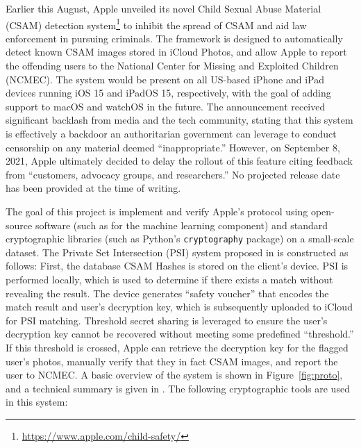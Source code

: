 
Earlier this August, Apple unveiled its novel Child Sexual Abuse Material (CSAM) detection system\footnote{\url{https://www.apple.com/child-safety/}} to inhibit the spread of CSAM and aid law enforcement in pursuing criminals. The framework is designed to automatically detect known CSAM images stored in iCloud Photos, and allow Apple to report the offending users to the National Center for Missing and Exploited Children (NCMEC). The system would be present on all US-based iPhone and iPad devices running iOS 15 and iPadOS 15, respectively, with the goal of adding support to macOS and watchOS in the future. The announcement received significant backlash from media and the tech community, stating that this system is effectively a backdoor an authoritarian government can leverage to conduct censorship on any material deemed ``inappropriate.'' However, on September 8, 2021, Apple ultimately decided to delay the rollout of this feature citing feedback from ``customers, advocacy groups, and researchers.'' No projected release date has been provided at the time of writing.

The goal of this project is implement and verify Apple's protocol using open-source software (such as \cite{athalyeNeuralHashCollider2021,ygvarAppleNeuralHash2ONNX2021,cheerlaNeuralHashAdversarialSteganographic2021} for the machine learning component) and standard cryptographic libraries (such as Python's \texttt{cryptography} package) on a small-scale dataset. The Private Set Intersection (PSI) system proposed in \cite{bhowmick2021apple} is constructed as follows: First, the database CSAM Hashes is stored on the client's device. PSI is performed locally, which is used to determine if there exists a match without revealing the result. The device generates ``safety voucher'' that encodes the match result and user's decryption key, which is subsequently uploaded to iCloud for PSI matching. Threshold secret sharing is leveraged to ensure the user's decryption key cannot be recovered without meeting some predefined ``threshold.'' If this threshold is crossed, Apple can retrieve the decryption key for the flagged user's photos, manually verify that they in fact CSAM images, and report the user to NCMEC. A basic overview of the system is shown in Figure~\ref{fig:proto}, and a technical summary is given in \cite{CSAMDetectionTechnical2021}. The following cryptographic tools are used in this system: 

